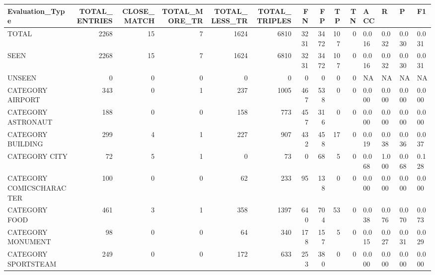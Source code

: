 \begin{tabular}{lrrrrrrrrrllll}
\hline
 Evaluation\_Type          &   TOTAL\_ENTRIES &   CLOSE\_MATCH &   TOTAL\_MORE\_TR &   TOTAL\_LESS\_TR &   TOTAL\_TRIPLES &   FN &   FP &   TP &   TN & ACC   & R     & P     & F1    \\
\hline
 TOTAL                    &            2268 &            15 &               7 &            1624 &            6810 & 3231 & 3472 &  107 &    0 & 0.016 & 0.032 & 0.030 & 0.031 \\
 SEEN                     &            2268 &            15 &               7 &            1624 &            6810 & 3231 & 3472 &  107 &    0 & 0.016 & 0.032 & 0.030 & 0.031 \\
 UNSEEN                   &               0 &             0 &               0 &               0 &               0 &    0 &    0 &    0 &    0 & NA    & NA    & NA    & NA    \\
 CATEGORY AIRPORT         &             343 &             0 &               1 &             237 &            1005 &  467 &  538 &    0 &    0 & 0.000 & 0.000 & 0.000 & 0.000 \\
 CATEGORY ASTRONAUT       &             188 &             0 &               0 &             158 &             773 &  457 &  316 &    0 &    0 & 0.000 & 0.000 & 0.000 & 0.000 \\
 CATEGORY BUILDING        &             299 &             4 &               1 &             227 &             907 &  432 &  458 &   17 &    0 & 0.019 & 0.038 & 0.036 & 0.037 \\
 CATEGORY CITY            &              72 &             5 &               1 &               0 &              73 &    0 &   68 &    5 &    0 & 0.068 & 1.000 & 0.068 & 0.128 \\
 CATEGORY COMICSCHARACTER &             100 &             0 &               0 &              62 &             233 &   95 &  138 &    0 &    0 & 0.000 & 0.000 & 0.000 & 0.000 \\
 CATEGORY FOOD            &             461 &             3 &               1 &             358 &            1397 &  640 &  704 &   53 &    0 & 0.038 & 0.076 & 0.070 & 0.073 \\
 CATEGORY MONUMENT        &              98 &             0 &               0 &              64 &             340 &  178 &  157 &    5 &    0 & 0.015 & 0.027 & 0.031 & 0.029 \\
 CATEGORY SPORTSTEAM      &             249 &             0 &               0 &             172 &             633 &  253 &  380 &    0 &    0 & 0.000 & 0.000 & 0.000 & 0.000 \\

\end{tabular}
